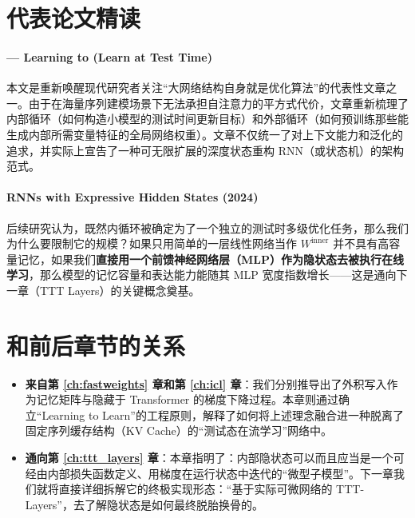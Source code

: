 \section{代表论文精读}
\label{sec:l2l_papers}

\paragraph{\citet{sun2023learning} — Learning to (Learn at Test Time)}
本文是重新唤醒现代研究者关注“大网络结构自身就是优化算法”的代表性文章之一。由于在海量序列建模场景下无法承担自注意力的平方式代价，文章重新梳理了内部循环（如何构造小模型的测试时间更新目标）和外部循环（如何预训练那些能生成内部所需变量特征的全局网络权重）。文章不仅统一了对上下文能力和泛化的追求，并实际上宣告了一种可无限扩展的深度状态重构 RNN（或状态机）的架构范式。

\paragraph{RNNs with Expressive Hidden States (2024)}
后续研究认为，既然内循环被确定为了一个独立的测试时多级优化任务，那么我们为什么要限制它的规模？如果只用简单的一层线性网络当作 $W^\text{inner}$ 并不具有高容量记忆，如果我们\textbf{直接用一个前馈神经网络层（MLP）作为隐状态去被执行在线学习}，那么模型的记忆容量和表达能力能随其 MLP 宽度指数增长——这是通向下一章（TTT Layers）的关键概念奠基。

\section{和前后章节的关系}
\label{sec:l2l_bridges}

\begin{itemize}
    \item \textbf{来自第 \ref{ch:fastweights} 章和第 \ref{ch:icl} 章}：我们分别推导出了外积写入作为记忆矩阵与隐藏于 Transformer 的梯度下降过程。本章则通过确立“Learning to Learn”的工程原则，解释了如何将上述理念融合进一种脱离了固定序列缓存结构（KV Cache）的“测试态在流学习”网络中。
    \item \textbf{通向第 \ref{ch:ttt_layers} 章}：本章指明了：内部隐状态可以而且应当是一个可经由内部损失函数定义、用梯度在运行状态中迭代的“微型子模型”。下一章我们就将直接详细拆解它的终极实现形态：“基于实际可微网络的 TTT-Layers”，去了解隐状态是如何最终脱胎换骨的。
\end{itemize}

